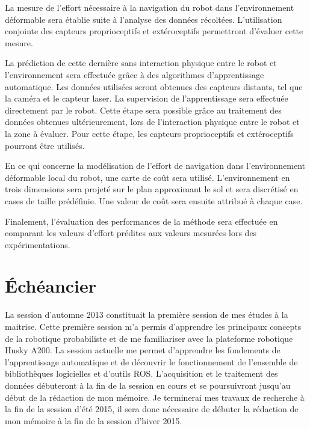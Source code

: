 \documentclass[12pt, letterpaper]{article} %
\begin{document}
La mesure de l'effort nécessaire à la navigation du robot dans l'environnement déformable sera établie  suite à l'analyse des données récoltées. L'utilisation conjointe des capteurs proprioceptifs et extéroceptifs permettront d'évaluer cette mesure.

La prédiction de cette dernière sans interaction physique entre le robot et l'environnement sera effectuée grâce à des algorithmes d'apprentissage automatique. Les données utilisées seront obtenues des capteurs distants, tel que la caméra et le capteur laser. La supervision de l'apprentissage sera effectuée directement par le robot. Cette étape sera possible grâce au traitement des données obtenues ultérieurement, lors de l'interaction physique entre le robot et la zone à évaluer. Pour cette étape, les capteurs proprioceptifs et extéroceptifs pourront être utilisés.  

En ce qui concerne la modélisation de l'effort de navigation dans l'environnement déformable local du robot, une carte de coût sera utilisé. L'environnement en trois dimensions sera projeté sur le plan approximant le sol et sera discrétisé en cases de taille prédéfinie. Une valeur de coût sera ensuite attribué à chaque case. 

Finalement, l'évaluation des performances de la méthode sera effectuée en comparant les valeurs d'effort prédites aux valeurs mesurées lors des expérimentations.

\section{Échéancier}
La session d'automne 2013 constituait la première session de mes études à la maitrise. Cette première session m'a permis d'apprendre les principaux concepts de la robotique probabiliste et de me familiariser avec la plateforme robotique Husky A200. La session actuelle me permet d'apprendre les fondements de l'apprentissage automatique et de découvrir le fonctionnement de l'ensemble de bibliothèques logicielles et d'outils ROS. L'acquisition et le traitement des données débuteront à la fin de la session en cours et se poursuivront jusqu'au début de la rédaction de mon mémoire. Je terminerai mes travaux de recherche à la fin de la session d'été 2015, il sera donc nécessaire de débuter la rédaction de mon mémoire à la fin de la session d'hiver 2015. 

\end{document}
